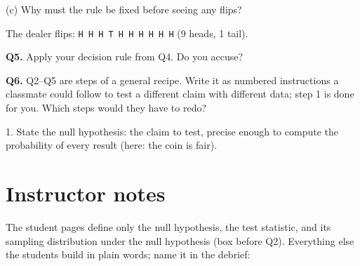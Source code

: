 \documentclass[11pt]{article}
\newif\ifsolutions
\newcommand{\answerbox}[2][2.2cm]{%
  \par\smallskip\noindent
  \begin{tcolorbox}[colback=white, colframe=gray!55, boxrule=0.4pt, sharp corners,
      height=#1, valign=top, left=5pt, right=5pt, top=3pt, bottom=3pt]
    \ifsolutions{\small\color{darkblue}#2}\fi
  \end{tcolorbox}\par}
\newcommand{\prefilledbox}[3][2.2cm]{%
  \par\smallskip\noindent
  \begin{tcolorbox}[colback=white, colframe=gray!55, boxrule=0.4pt, sharp corners,
      height=#1, valign=top, left=5pt, right=5pt, top=3pt, bottom=3pt]
    {\small #2}\ifsolutions\par{\small\color{darkblue}#3}\fi
  \end{tcolorbox}\par}
\newcommand{\question}[1]{\par\medskip\noindent\textbf{#1}\enspace}
\begin{document}
(c) Why must the rule be fixed before seeing any flips?
\answerbox[1.2cm]{Otherwise we could always pick a list that contains what we saw,
and the 1-in-20 promise, which is about the rule, would mean nothing.}

\medskip
The dealer flips: \quad \texttt{H H H T H H H H H H} \quad (9 heads, 1 tail).

\question{Q5.}
Apply your decision rule from Q4. Do you accuse?
\answerbox[1.0cm]{Yes: 9 heads is on the list $\{0, 1, 9, 10\}$.}

\question{Q6.}
Q2--Q5 are steps of a general recipe.
Write it as numbered instructions a classmate could follow to test a different claim with different data;
step 1 is done for you. Which steps would they have to redo?
\prefilledbox[3.8cm]{1. State the null hypothesis: the claim to test,
precise enough to compute the probability of every result (here: the coin is fair).}{%
2. Choose a test statistic (the number of heads).\par
3. Find its sampling distribution under the null hypothesis (the binomial table).\par
4. Before seeing the data, list the values that lead to rejecting the null hypothesis,
so that a true null hypothesis is rejected at most a chosen fraction of the time (1 in 20).\par
5. Collect the data, compute the test statistic, and reject if it is on the list.\par
Redo steps 2--4 for a new claim: the statistic, its distribution under the null, and the list.}

\ifsolutions
\newpage
\section*{Instructor notes}
\small

The student pages define only the null hypothesis, the test statistic,
and its sampling distribution under the null hypothesis (box before Q2).
Everything else the students build in plain words; name it in the debrief:
\end{document}
